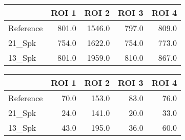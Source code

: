 \begin{tabular}{lrrrr}
\toprule
{} &  ROI 1 &   ROI 2 &  ROI 3 &  ROI 4 \\
\midrule
Reference &  801.0 &  1546.0 &  797.0 &  809.0 \\
21\_Spk    &  754.0 &  1622.0 &  754.0 &  773.0 \\
13\_Spk    &  801.0 &  1959.0 &  810.0 &  867.0 \\
\bottomrule
\end{tabular}
\begin{tabular}{lrrrr}
\toprule
{} &  ROI 1 &  ROI 2 &  ROI 3 &  ROI 4 \\
\midrule
Reference &   70.0 &  153.0 &   83.0 &   76.0 \\
21\_Spk    &   24.0 &  141.0 &   20.0 &   33.0 \\
13\_Spk    &   43.0 &  195.0 &   36.0 &   60.0 \\
\bottomrule
\end{tabular}
